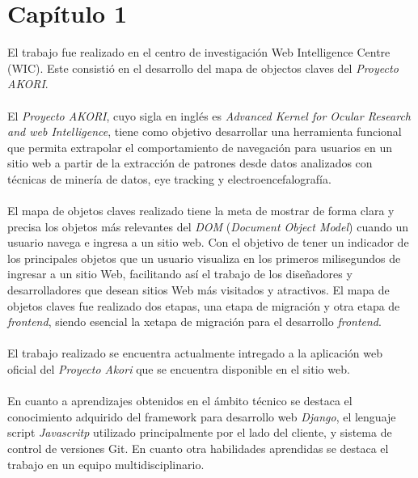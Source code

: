 \documentclass[letterpaper,11pt]{article} %
\begin{document}





\chapter{Capítulo 1}

\begin{resumen}
	El trabajo fue realizado en el centro de investigación Web Intelligence Centre (WIC). Este consistió en el desarrollo del mapa de objectos claves del \textit{Proyecto AKORI}. \\ \\
	El \textit{Proyecto AKORI}, cuyo sigla en inglés es \textit{Advanced Kernel for Ocular Research and web Intelligence}, tiene como objetivo desarrollar una herramienta funcional que permita extrapolar el comportamiento de navegación para usuarios en un sitio web a partir de la extracción
de patrones desde datos analizados con técnicas de minería de datos, eye tracking y electroencefalografía. \\ \\
	El mapa de objetos claves realizado tiene la meta de mostrar de forma clara y precisa los objetos más relevantes del \textit{DOM} (\textit{Document Object Model}) cuando un usuario navega e ingresa a un sitio web. Con el objetivo de tener un indicador de los principales objetos que un usuario visualiza en los primeros milisegundos de ingresar a un sitio Web, facilitando así el trabajo de los diseñadores y desarrolladores que desean sitios Web más visitados y atractivos. El mapa de objetos claves fue realizado dos etapas, una etapa de migración y otra etapa de \textit{frontend}, siendo esencial la xetapa de migración para el desarrollo \textit{frontend}. \\ \\
	El trabajo realizado se encuentra actualmente intregado a la aplicación web oficial del \textit{Proyecto Akori} que se encuentra disponible en el sitio web. \\ \\
	En cuanto a aprendizajes obtenidos en el ámbito técnico se destaca el conocimiento adquirido del framework para desarrollo web \textit{Django}, el lenguaje script \textit{Javascritp} utilizado principalmente por el lado del cliente, y sistema de control de versiones Git. En cuanto otra habilidades aprendidas se destaca el trabajo en un equipo multidisciplinario.
\end{resumen}






\end{document}
